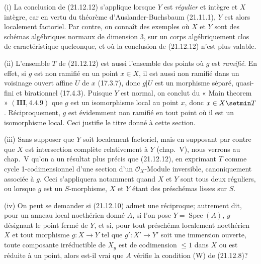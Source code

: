 \begin{remarks}[21.12.14]
\label{IV.21.12.14}
(i) La conclusion de (21.12.12) s'applique lorsque $Y$ est \emph{régulier} et intègre et $X$
intègre, car en vertu du théorème d'Auslander-Buchsbaum (21.11.1), $Y$ est alors
localement factoriel. Par contre, on connaît des exemples où $X$ et $Y$ sont des schémas
algébriques normaux de dimension $3$, sur un corps algébriquement clos de
caractéristique quelconque, et où la conclusion de (21.12.12) n'est plus valable.

(ii) L'ensemble $T$ de (21.12.12) est aussi l'ensemble des points où $g$ est
\emph{ramifié}. En effet, si $g$ est non ramifié en un point $x\in X$, il est aussi non
ramifié dans un voisinage ouvert affine $U$ de $x$ (17.3.7), donc $g|U$ est un morphisme
séparé, quasi-fini et birationnel (17.4.3). Puisque $Y$ est normal, on conclut du « Main
theorem » $(\mathbf{III}, 4.4.9)$ que $g$ est un isomorphisme local au point $x$, donc
$x\in X\setmin T$. Réciproquement, $g$ est évidemment non ramifié en tout point où il est un
isomorphisme local. Ceci justifie le titre donné à cette section.

(iii) Sans supposer que $Y$ soit localement factoriel, mais en supposant par contre que
$X$ est intersection complète relativement à $Y$ (chap.~V), nous verrons au chap.~V
qu'on a un résultat plus précis que (21.12.12), en exprimant $T$ comme cycle
1-codimensionnel d'une section d'un $\mathcal O_X$-Module inversible, canoniquement
associée à $g$. Ceci s'appliquera notamment quand $X$ et $Y$ sont tous deux réguliers,
ou lorsque $g$ est un $S$-morphisme, $X$ et $Y$ étant des préschémas lisses sur $S$.

(iv) On peut se demander si (21.12.10) admet une réciproque; autrement dit, pour un
anneau local noethérien donné $A$, si l'on pose $Y=\operatorname{Spec}(A)$, $y$
désignant le point fermé de $Y$, et si, pour tout préschéma localement noethérien $X$ et
tout morphisme $g:X\to Y$ tel que $g':X'\to Y'$ soit une immersion ouverte, toute
composante irréductible de $X_y$ est de codimension $\leq1$ dans $X$ ou est réduite à
un point, alors est-il vrai que $A$ vérifie la condition (W) de (21.12.8)?


\end{remarks}
